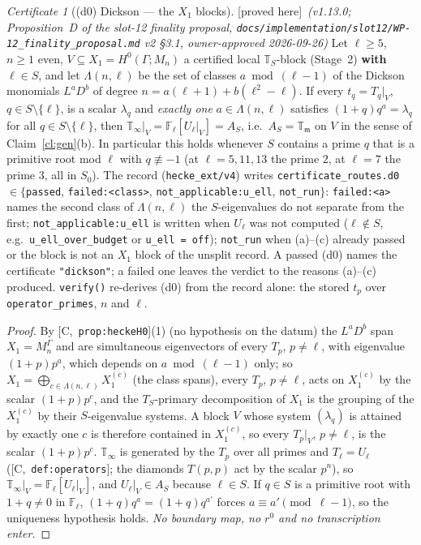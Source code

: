 \documentclass[11pt]{article}
\theoremstyle{remark}
\newtheorem{certificate}[theorem]{Certificate}
\newcommand{\F}{\mathbb{F}}
\newcommand{\Ga}{\Gamma}
\newcommand{\Fl}{\F_\ell}
\newcommand{\T}{\mathbb{T}}
\newcommand{\m}{\mathfrak{m}}
\newcommand{\Mn}{M_n}
\newcommand{\HA}[1]{[C,~\texttt{#1}]}      %
\newcommand{\PROVED}{\textsf{[proved here]}}
\begin{document}
\begin{certificate}[(d0) Dickson --- the $X_1$ blocks]\label{cert:dickson}\PROVED\ \emph{(v1.13.0;
Proposition~D of the slot-12 finality proposal, \texttt{docs/implementation/slot12/WP-12\_finality\_proposal.md}
v2 \S3.1, owner-approved 2026-09-26)}
Let $\ell\ge5$, $n\ge1$ even, $V\subseteq X_1=H^0(\Ga;\Mn)$ a certified local $\T_S$-block (Stage~2)
\textbf{with $\ell\in S$}, and let $\Lambda(n,\ell)$ be the set of classes $a\bmod(\ell-1)$ of the
Dickson monomials $L^aD^b$ of degree $n=a(\ell+1)+b(\ell^2-\ell)$. If every $t_q=T_q|_V$,
$q\in S\setminus\{\ell\}$, is a scalar $\lambda_q$ and \emph{exactly one} $a\in\Lambda(n,\ell)$ satisfies
$(1+q)q^{a}=\lambda_q$ for all $q\in S\setminus\{\ell\}$, then $\T_\infty|_V=\Fl[U_\ell|_V]=A_S$, i.e.\
$A_S=\T_\m$ on $V$ in the sense of Claim~\ref{cl:gen}(b). In particular this holds whenever $S$ contains
a prime $q$ that is a primitive root mod $\ell$ with $q\not\equiv-1$ (at $\ell=5,11,13$ the prime $2$, at
$\ell=7$ the prime $3$, all in $S_0$).
The record (\texttt{hecke\_ext/v4}) writes \texttt{certificate\_routes.d0} $\in\{$\texttt{passed},
\texttt{failed:<class>}, \texttt{not\_applicable:u\_ell}, \texttt{not\_run}$\}$: \texttt{failed:<a>} names
the second class of $\Lambda(n,\ell)$ the $S$-eigenvalues do not separate from the first;
\texttt{not\_applicable:u\_ell} is written when $U_\ell$ was not computed ($\ell\notin S$, e.g.\
\texttt{u\_ell\_over\_budget} or \texttt{u\_ell = off}); \texttt{not\_run} when (a)--(c) already passed or
the block is not an $X_1$ block of the unsplit record. A passed (d0) names the certificate
\texttt{"dickson"}; a failed one leaves the verdict to the reasons (a)--(c) produced. \texttt{verify()}
re-derives (d0) from the record alone: the stored $t_p$ over \texttt{operator\_primes}, $n$ and $\ell$.
\end{certificate}
\begin{proof}
By \HA{prop:heckeH0}(1) (no hypothesis on the datum) the $L^aD^b$ span $X_1=M_n^{\Ga}$ and are
simultaneous eigenvectors of every $T_p$, $p\ne\ell$, with eigenvalue $(1+p)p^{a}$, which depends on
$a\bmod(\ell-1)$ only; so $X_1=\bigoplus_{c\in\Lambda(n,\ell)}X_1^{(c)}$ (the class spans), every $T_p$,
$p\ne\ell$, acts on $X_1^{(c)}$ by the scalar $(1+p)p^{c}$, and the $T_S$-primary decomposition of $X_1$ is
the grouping of the $X_1^{(c)}$ by their $S$-eigenvalue systems. A block $V$ whose system $(\lambda_q)$ is
attained by exactly one $c$ is therefore contained in $X_1^{(c)}$, so every $T_p|_V$, $p\ne\ell$, is the
scalar $(1+p)p^{c}$. $\T_\infty$ is generated by the $T_p$ over all primes and $T_\ell=U_\ell$
(\HA{def:operators}; the diamonds $T(p,p)$ act by the scalar $p^{n}$), so $\T_\infty|_V=\Fl[U_\ell|_V]$,
and $U_\ell|_V\in A_S$ because $\ell\in S$. If $q\in S$ is a primitive root with $1+q\ne0$ in $\Fl$,
$(1+q)q^{a}=(1+q)q^{a'}$ forces $a\equiv a'\pmod{\ell-1}$, so the uniqueness hypothesis holds. \emph{No
boundary map, no $r^0$ and no transcription enter.}
\end{proof}
\end{document}
